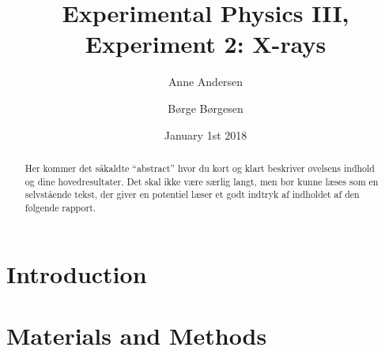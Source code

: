 \documentclass[danish,a4paper,twocolumn,amsmath,amssymb,floatfix]{revtex4-1}
\begin{document}

\bigskip
\title{Experimental Physics III, Experiment 2: X-rays}

\author{Anne Andersen}%
\author{Børge Børgesen}%
\date{January 1st 2018} %

\begin{abstract}
\bigskip


Her kommer det såkaldte \enquote{abstract} hvor du kort og klart beskriver øvelsens indhold og dine hovedresultater. Det skal ikke være særlig langt, men bør kunne læses som en selvstående tekst, der giver en potentiel læser et godt indtryk af indholdet af den følgende rapport.
\end{abstract}

\maketitle

\noindent
\section*{Introduction}



\section*{Materials and Methods}
\end{document}

